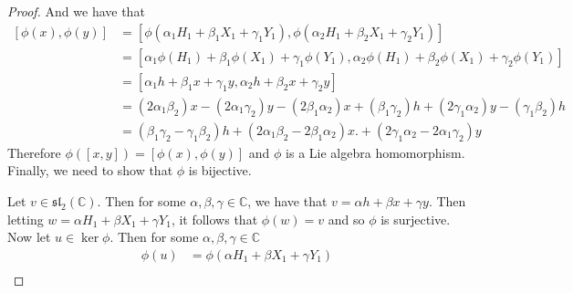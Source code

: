 \documentclass[12pt]{article}
\theoremstyle{definition}
\begin{document}
\begin{enumerate}
\begin{enumerate}[label=(\alph*)]
\begin{proof}
                        And we have that 
                        \begin{equation*}
                            \begin{split}
                                [\phi(x), \phi(y)] &=
                                [\phi(\alpha_1H_1+\beta_1X_1+\gamma_1Y_1),
                                \phi(\alpha_2H_1+\beta_2X_1+\gamma_2Y_1)] \\
                                &=[\alpha_1\phi(H_1)+\beta_1\phi(X_1)+\gamma_1\phi(Y_1),
                                \alpha_2\phi(H_1)+\beta_2\phi(X_1)+\gamma_2\phi(Y_1)]
                                \\
                                &=[\alpha_1 h+\beta_1 x+\gamma_1y, \alpha_2
                                h+\beta_2 x+\gamma_2 y] \\
                                &=
                                (2\alpha_1\beta_2)x-(2\alpha_1\gamma_2)y
                                -(2\beta_1\alpha_2)x+(\beta_1\gamma_2)h
                                +(2\gamma_1\alpha_2)y-(\gamma_1\beta_2)h \\
                                &=(\beta_1\gamma_2-\gamma_1\beta_2)h
                                +(2\alpha_1\beta_2-2\beta_1\alpha_2)x.
                                +(2\gamma_1\alpha_2-2\alpha_1\gamma_2)y
                            \end{split}
                        \end{equation*}
                        Therefore $\phi([x, y])=[\phi(x), \phi(y)]$ and $\phi$
                        is a Lie algebra homomorphism. Finally, we need to show
                        that $\phi$ is bijective. \par\hspace{4mm} Let
                        $v\in\mathfrak{sl}_2(\mathbb{C})$. Then for some
                        $\alpha, \beta, \gamma\in \mathbb{C}$, we have that
                        $v=\alpha h+\beta x+\gamma y$. Then letting $w=\alpha
                        H_1+\beta X_1+\gamma Y_1$, it follows that $\phi(w)=v$
                        and so $\phi$ is surjective. Now let $u\in\ker\phi$.
                        Then for some $\alpha, \beta, \gamma\in \mathbb{C}$
                        \begin{equation*}
                            \begin{split}
                                \phi(u)&=\phi(\alpha H_1+\beta X_1+\gamma Y_1)
                                \\

\end{split}
\end{equation*}
\end{proof}
\end{enumerate}
\end{enumerate}
\end{document}
